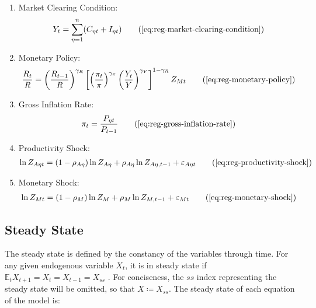\documentclass[
	thesis.tex
	]{subfiles}
\begin{document}
{\begin{itemize}
\begin{enumerate}
			\item Market Clearing Condition:
			\begin{align}
				Y_t = \sum_{\eta=1}^{n} (C_{\eta t} + I_{\eta t}) \tag{\ref{eq:reg-market-clearing-condition}}
			\end{align}
			
			\item Monetary Policy:
			\begin{align}
				\frac{R_t}{R} = \left( 
				\frac{R_{t-1}}{R} \right)^{\gamma_R} \left[ \left(
				\frac{\pi_t}{\pi} \right)^{\gamma_\pi} \left( 
				\frac{Y_t}{Y} \right)^{\gamma_Y} \right]^{1-\gamma_R} Z_{Mt}
				\tag{\ref{eq:reg-monetary-policy}}
			\end{align}
			
			\item Gross Inflation Rate:
			\begin{align}
				\pi_t = \frac{P_{\eta t}}{P_{t-1}}
				\tag{\ref{eq:reg-gross-inflation-rate}}
			\end{align}
			
			\item Productivity Shock:
			\begin{align}
				\ln{Z_{A\eta t}} = (1-\rho_{A\eta})\ln{Z_{A\eta}} + \rho_{A\eta}\ln{Z_{A\eta,t-1}} + \varepsilon_{A\eta t}
				\tag{\ref{eq:reg-productivity-shock}}
			\end{align}
			
			\item Monetary Shock:
			\begin{align}
				\ln{Z_{Mt}} = (1-\rho_M)\ln{Z_{M}} + \rho_M\ln{Z_{M,t-1}} + \varepsilon_{Mt}
				\tag{\ref{eq:reg-monetary-shock}}
			\end{align}
			
		\end{enumerate}
		
	\end{itemize}
	
} %



\subsection{Steady State}

The steady state is defined by the constancy of the variables through time. For any given endogenous variable $X_t$, it is in steady state if $\mathbb{E}_t X_{t+1} = X_t = X_{t-1} = X_{ss}$ \cite[p.41]{costa_junior_understanding_2016}. For conciseness, the $ss$ index representing the steady state will be omitted, so that $X \coloneq X_{ss}$. The steady state of each equation of the model is:
\end{document}
